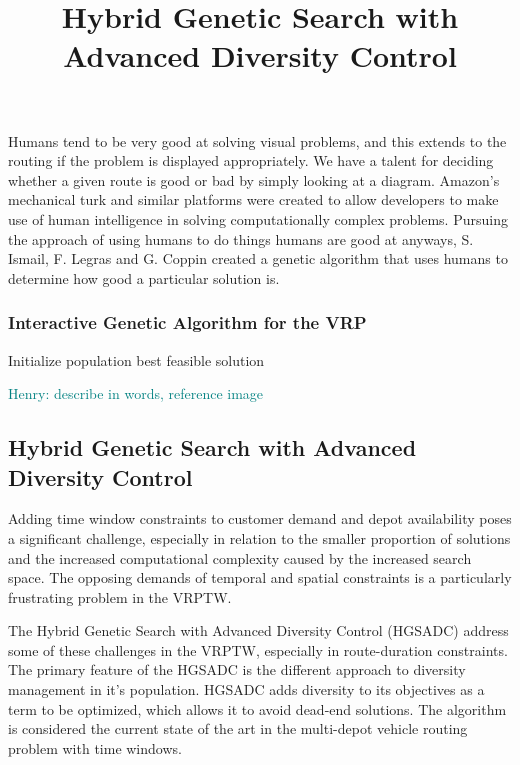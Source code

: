\documentclass{sig-alternate}
\newcommand{\allcomments}[1]{{#1}}
\newcommand{\hfcomment}[1]{\textcolor{Teal}{\allcomments{Henry: {#1}}}}
\begin{document}
{Humans tend to be very good at solving visual problems, and this extends to the routing if the problem is displayed appropriately. We have a talent for deciding whether a given route is good or bad by simply looking at a diagram. Amazon's mechanical turk and similar platforms were created to allow developers to make use of human intelligence in solving computationally complex problems. Pursuing the approach of using humans to do things humans are good at anyways, S. Ismail, F. Legras and G. Coppin\cite{Ismail:2012} created a genetic algorithm that uses humans to determine how good a particular solution is. 

\subsubsection{Interactive Genetic Algorithm for the VRP}


\title{Hybrid Genetic Search with Advanced Diversity Control}
\begin{algorithm}
Initialize population\;
\Return best feasible solution\;
\end{algorithm}
\hfcomment{describe in words, reference image}
\subsection{Hybrid Genetic Search with Advanced Diversity Control}
Adding time window constraints to customer demand and depot availability poses a significant challenge, especially in relation to the smaller proportion of solutions and the increased computational complexity caused by the increased search space. The opposing demands of temporal and spatial constraints is a particularly frustrating problem in the VRPTW.

The Hybrid Genetic Search with Advanced Diversity Control (HGSADC) address some of these challenges in the VRPTW, especially in route-duration constraints. The primary feature of the HGSADC is the different approach to diversity management in it's population. HGSADC adds diversity to its objectives as a term to be optimized, which allows it to avoid dead-end solutions. The algorithm is considered the current state of the art in the multi-depot vehicle routing problem with time windows\cite{Vidal:2013}.

}
\end{document}
